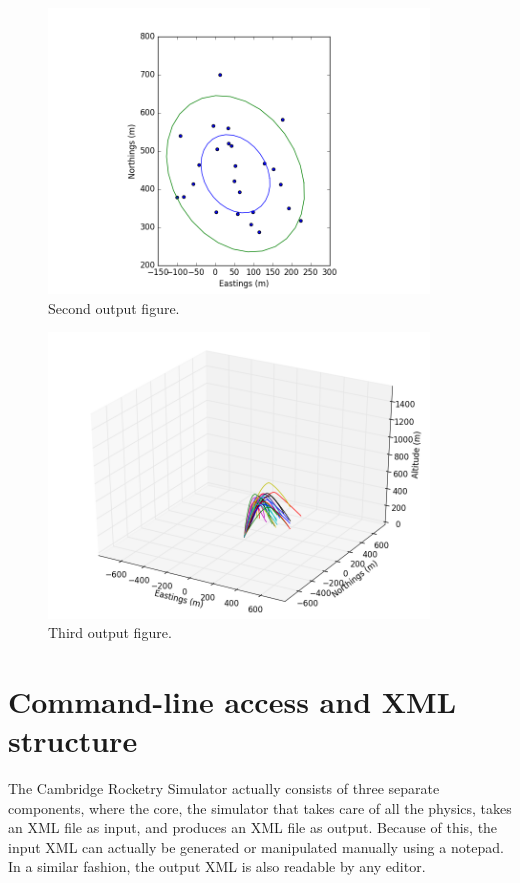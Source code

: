 \documentclass[11pt, a4paper]{article}
\begin{document}
\begin{figure}
  \centering
    \includegraphics[width=0.9\textwidth]{crs_3_output_2.png}
  \caption{Second output figure.}
  \label{fig:crs_32}
\end{figure}

\begin{figure}
  \centering
    \includegraphics[width=0.9\textwidth]{crs_3_output_3.png}
  \caption{Third output figure.}
  \label{fig:crs_33}
\end{figure}

\section{Command-line access and XML structure}

The Cambridge Rocketry Simulator actually consists of three separate components, where the core, the simulator that takes care of all the physics, takes an XML file as input, and produces an XML file as output. Because of this, the input XML can actually be generated or manipulated manually using a notepad. In a similar fashion, the output XML is also readable by any editor.
\end{document}
